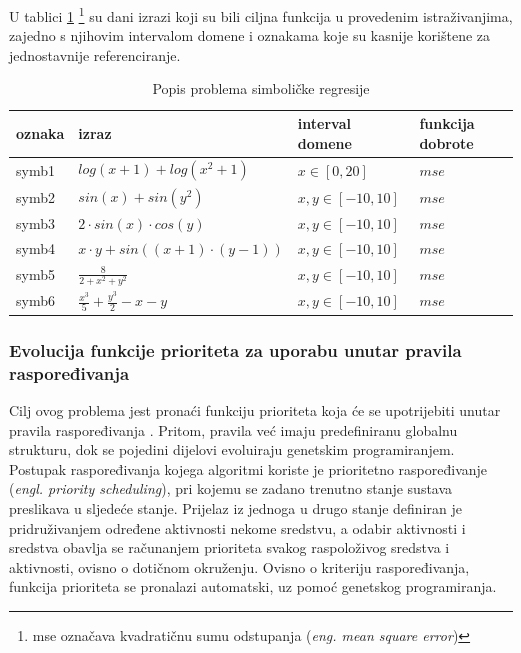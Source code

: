 U tablici \ref{bla} \footnote{mse označava kvadratičnu sumu odstupanja (\textit{eng. mean square error})} su dani izrazi koji su bili ciljna funkcija u provedenim istraživanjima, zajedno s njihovim intervalom domene i oznakama koje su kasnije korištene za jednostavnije referenciranje.

\begin{table}[H]
 	\centering
 \caption{Popis problema simboličke regresije}
    \begin{tabular}{| l | l | l | l |}
    \hline
    oznaka & izraz & interval domene & funkcija dobrote\\ \hline
    symb1 & $log(x+1)+log(x^2+1)$ & $x \in [0, 20]$ & $mse$ \\ \hline
    symb2 & $sin(x) + sin(y^2)$ & $x, y \in [-10, 10]$ & $mse$\\ \hline
    symb3 & $2 \cdot sin(x) \cdot cos(y)$ & $x, y \in [-10, 10]$ & $mse$\\ \hline
    symb4 & $x \cdot y + sin((x+1) \cdot (y-1))$ & $x, y \in [-10, 10]$ & $mse$\\ \hline
    symb5 & \Large{ $\frac{8}{2 + x^2 + y^2}$ }& $x, y \in [-10, 10]$ & $mse$\\ \hline
    symb6 & $\frac{x^3}{5} + \frac{y^3}{2} - x - y$ & $x, y \in [-10, 10]$ & $mse$\\ \hline
    \end{tabular}
    
   
    \label{bla}
\end{table}

\subsubsection{Evolucija funkcije prioriteta za uporabu unutar pravila raspoređivanja}
Cilj ovog problema jest pronaći funkciju prioriteta koja će se upotrijebiti unutar pravila raspoređivanja \cite{jakobovic}. Pritom, pravila već imaju predefiniranu globalnu strukturu, dok se pojedini dijelovi evoluiraju genetskim programiranjem. Postupak raspoređivanja kojega algoritmi koriste je prioritetno raspoređivanje (\textit{engl. priority scheduling}), pri kojemu se zadano trenutno stanje sustava preslikava u sljedeće stanje. Prijelaz iz jednoga u drugo stanje definiran je pridruživanjem određene aktivnosti nekome sredstvu, a odabir aktivnosti i sredstva obavlja se računanjem prioriteta svakog raspoloživog sredstva i aktivnosti, ovisno o dotičnom okruženju. Ovisno o kriteriju raspoređivanja, funkcija prioriteta se pronalazi automatski, uz pomoć genetskog programiranja.


